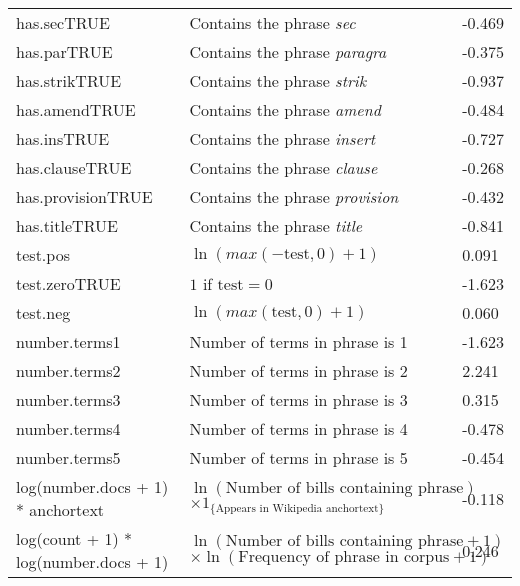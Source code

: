 \begin{table*}
\begin{center}
\begin{tabular}{|p{6.0cm}|p{6.7cm}|p{1.0cm}|}
      has.secTRUE & \textcolor{black}{}Contains the phrase \emph{sec} & \textcolor{black}{}-0.469 \\ \textcolor{black} {}
      has.parTRUE & \textcolor{black}{}Contains the phrase \emph{paragra} & \textcolor{black}{}-0.375 \\ \textcolor{black} {}
      has.strikTRUE & \textcolor{black}{}Contains the phrase \emph{strik} & \textcolor{black}{}-0.937 \\ \textcolor{black} {}
      has.amendTRUE & \textcolor{black}{}Contains the phrase \emph{amend} & \textcolor{black}{}-0.484 \\ \textcolor{black} {}
      has.insTRUE & \textcolor{black}{}Contains the phrase \emph{insert} & \textcolor{black}{}-0.727 \\ \textcolor{black} {}
      has.clauseTRUE & \textcolor{black}{}Contains the phrase \emph{clause} & \textcolor{black}{}-0.268 \\ \textcolor{black} {}
      has.provisionTRUE & \textcolor{black}{}Contains the phrase \emph{provision} & \textcolor{black}{}-0.432 \\ \textcolor{black} {}
      has.titleTRUE & \textcolor{black}{}Contains the phrase \emph{title} & \textcolor{black}{}-0.841 \\ \textcolor{black} {}
      test.pos & \textcolor{black}{}$\ln(max(-\mbox{test}, 0) + 1)$ & \textcolor{black}{}0.091 \\ \textcolor{black} {}
      test.zeroTRUE & \textcolor{black}{}$1$ if $\mbox{test} = 0$ & \textcolor{black}{}-1.623 \\ \textcolor{black} {}
      test.neg & \textcolor{black}{}$\ln(max(\mbox{test}, 0) + 1)$ & \textcolor{black}{}0.060 \\ \textcolor{black} {}
      number.terms1 & \textcolor{black}{}Number of terms in phrase is 1 & \textcolor{black}{}-1.623 \\ \textcolor{black} {}
      number.terms2 & \textcolor{black}{}Number of terms in phrase is 2 & \textcolor{black}{}2.241 \\ \textcolor{black} {}
      number.terms3 & \textcolor{black}{}Number of terms in phrase is 3 & \textcolor{black}{}0.315 \\ \textcolor{black} {}
      number.terms4 & \textcolor{black}{}Number of terms in phrase is 4 & \textcolor{black}{}-0.478 \\ \textcolor{black} {}
      number.terms5 & \textcolor{black}{}Number of terms in phrase is 5 & \textcolor{black}{}-0.454 \\ \textcolor{black} {}
      log(number.docs + 1) * anchortext & \textcolor{black}{}$\ln(\mbox{Number of bills containing phrase})$
      $\times 1_{\{ \mbox{Appears in Wikipedia anchortext} \}}$ & \textcolor{black}{}-0.118 \\ \textcolor{black} {}
      log(count + 1) * log(number.docs + 1) & \textcolor{black}{}$\ln(\mbox{Number of bills containing phrase} + 1)$
      $\times \ln(\mbox{Frequency of phrase in corpus} + 1)$ & \textcolor{black}{} 0.246 \\
      \hline
    \end{tabular}
    \end{center}
\end{table*}
